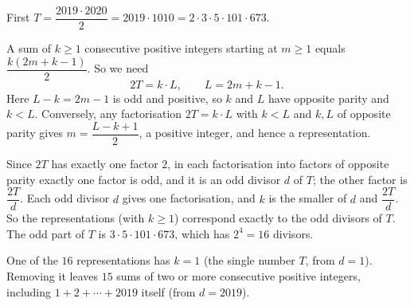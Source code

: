 First $T=\dfrac{2019\cdot2020}{2}=2019\cdot1010=2\cdot3\cdot5\cdot101\cdot673$.

A sum of $k\ge1$ consecutive positive integers starting at $m\ge1$ equals $\dfrac{k(2m+k-1)}{2}$. So we need
\[
2T=k\cdot L,\qquad L=2m+k-1 .
\]
Here $L-k=2m-1$ is odd and positive, so $k$ and $L$ have opposite parity and $k<L$. Conversely, any factorisation $2T=k\cdot L$ with $k<L$ and $k,L$ of opposite parity gives $m=\dfrac{L-k+1}{2}$, a positive integer, and hence a representation.

Since $2T$ has exactly one factor $2$, in each factorisation into factors of opposite parity exactly one factor is odd, and it is an odd divisor $d$ of $T$; the other factor is $\dfrac{2T}{d}$. Each odd divisor $d$ gives one factorisation, and $k$ is the smaller of $d$ and $\dfrac{2T}{d}$. So the representations (with $k\ge1$) correspond exactly to the odd divisors of $T$. The odd part of $T$ is $3\cdot5\cdot101\cdot673$, which has $2^4=16$ divisors.

One of the $16$ representations has $k=1$ (the single number $T$, from $d=1$). Removing it leaves $\boxed{15}$ sums of two or more consecutive positive integers, including $1+2+\cdots+2019$ itself (from $d=2019$).
